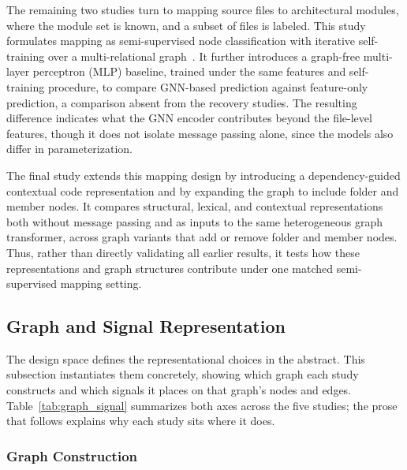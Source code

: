 The remaining two studies turn to mapping source files to architectural modules, where the module set is known, and a subset of files is labeled. This study formulates mapping as semi-supervised node classification with iterative self-training over a multi-relational graph~\cite{mapping_ext}. It further introduces a graph-free multi-layer perceptron (MLP) baseline, trained under the same features and self-training procedure, to compare GNN-based prediction against feature-only prediction, a comparison absent from the recovery studies. The resulting difference indicates what the GNN encoder contributes beyond the file-level features, though it does not isolate message passing alone, since the models also differ in parameterization.

The final study extends this mapping design by introducing a dependency-guided contextual code representation and by expanding the graph to include folder and member nodes. It compares structural, lexical, and contextual representations both without message passing and as inputs to the same heterogeneous graph transformer, across graph variants that add or remove folder and member nodes. Thus, rather than directly validating all earlier results, it tests how these representations and graph structures contribute under one matched semi-supervised mapping setting.


\subsection{Graph and Signal Representation}
\label{sec:graph_signal_representation}

The design space defines the representational choices in the abstract. This subsection instantiates them concretely, showing which graph each study constructs and which signals it places on that graph's nodes and edges. Table~\ref{tab:graph_signal} summarizes both axes across the five studies; the prose that follows explains why each study sits where it does.

\subsubsection{Graph Construction}

